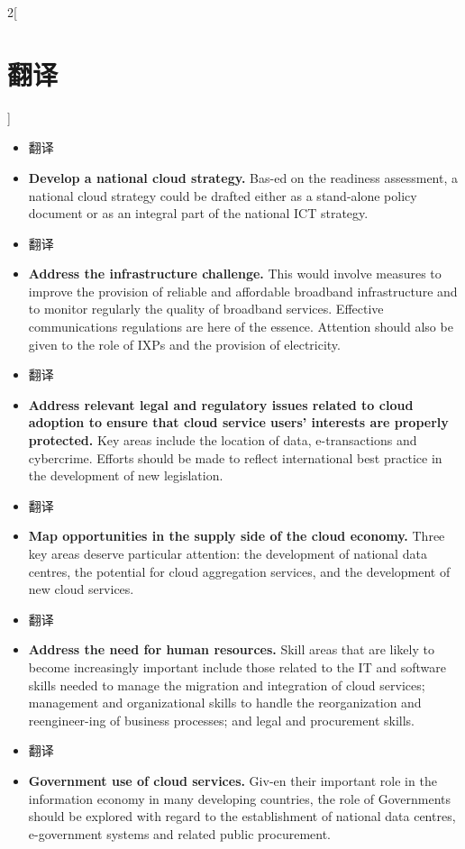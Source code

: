 \documentclass[a4paper, UTF8, 12pt]{article}
\begin{document}
\begin{paracol}{2}[\section{翻译}]
\begin{itemize}
        \switchcolumn*
        \item 翻译
        \switchcolumn
        \item {\bfseries Develop a national	cloud strategy.} Bas-ed on the readiness assessment, a national cloud strategy could be drafted either as a stand-alone policy document or as an integral part of the national ICT strategy. 
        
        \switchcolumn*
        \item 翻译
        \switchcolumn
        \item {\bfseries Address the infrastructure challenge.} This would involve measures to improve the provision of reliable and affordable broadband infrastructure and to monitor regularly the quality of broadband services. Effective communications regulations are here of the essence. Attention should also be given to the role of IXPs and the provision of electricity.
        
        \switchcolumn*
        \item 翻译
        \switchcolumn
        \item {\bfseries Address relevant legal	and	regulatory	issues related to cloud	adoption to	ensure that	cloud	service	users’ interests are properly protected.} Key areas include the location of data, e-transactions and cybercrime. Efforts should be made to reflect international best practice in the development of new legislation. 
        
        \switchcolumn*
        \item 翻译
        \switchcolumn
        \item {\bfseries Map opportunities in the supply side of the	cloud economy.} Three key areas deserve particular attention: the development of national data centres, the potential for cloud aggregation services, and the development of new cloud services. 

        \switchcolumn*
        \item 翻译
        \switchcolumn
        \item {\bfseries Address the need for human resources.} Skill areas that are likely to become increasingly important include those related to the IT and software skills needed to manage the migration and integration of cloud services; management and organizational skills to handle the reorganization and reengineer-ing of business processes; and legal and procurement skills. 
        
        \switchcolumn*
        \item 翻译
        \switchcolumn
        \item {\bfseries Government use of cloud services.} Giv-en their important role in the information economy in many developing countries, the role of Governments should be explored with regard to the establishment of national data centres, e-government systems and related public procurement. 
    

\end{itemize}
\end{paracol}
\end{document}
